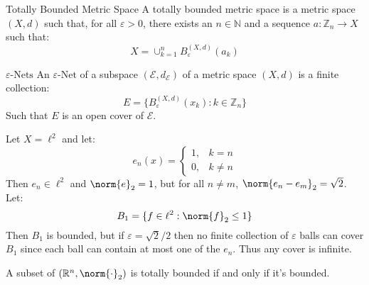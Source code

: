 \documentclass[crop=false,class=book,oneside]{standalone}
\begin{document}
            \begin{ldefinition}{Totally Bounded Metric Space}
                A totally bounded metric space is a metric
                space $(X,d)$ such that, for all $\varepsilon>0$,
                there exists an $n\in\mathbb{N}$ and a sequence
                $a:\mathbb{Z}_{n}\rightarrow{X}$ such that:
                \begin{equation}
                    X=\cup_{k=1}^{n}B_{\varepsilon}^{(X,d)}(a_{k})
                \end{equation}
            \end{ldefinition}
            \begin{ldefinition}{$\varepsilon\textrm{-Nets}$}
                An $\varepsilon\textrm{-Net}$ of a subspace
                $(\mathcal{E},d_{\mathcal{E}})$ of a
                metric space $(X,d)$ is a finite collection:
                \begin{equation}
                    E=\{B_{\varepsilon}^{(X,d)}(x_{k}):
                        k\in\mathbb{Z}_{n}\}
                \end{equation}
                Such that $E$ is an open cover of $\mathcal{E}$.
            \end{ldefinition}
            \begin{lexample}
                Let $X=\ell^{2}$ and let:
                \begin{equation}
                    e_{n}(x)=
                    \begin{cases}
                        1,&k=n\\
                        0,&k\ne{n}
                    \end{cases}
                \end{equation}
                Then $e_{n}\in\ell^{2}$ and $\norm{e}_{2}=1$,
                but for all $n\ne{m}$,
                $\norm{e_{n}-e_{m}}_{2}=\sqrt{2}$. Let:
                \begin{equation}
                    B_{1}=\{f\in\ell^{2}:\norm{f}_{2}\leq{1}\}
                \end{equation}
                Then $B_{1}$ is bounded, but if
                $\varepsilon=\sqrt{2}/2$ then no finite collection
                of $\varepsilon$ balls can cover $B_{1}$ since
                each ball can contain at most one of the
                $e_{n}$. Thus any cover is infinite.
            \end{lexample}
            \begin{theorem}
                A subset of $(\mathbb{R}^{n},\norm{\cdot}_{2})$
                is totally bounded if and only if it's bounded.
            \end{theorem}
\end{document}

